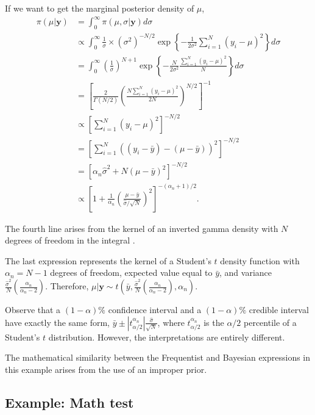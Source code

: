 If we want to get the marginal posterior density of $\mu$, 
\begin{align*}
	\pi(\mu|\mathbf{y})&=\int_{0}^{\infty} \pi(\mu,\sigma|\mathbf{y}) d\sigma\\
	&\propto \int_{0}^{\infty} \frac{1}{\sigma}\times (\sigma^2)^{-N/2}\exp\left\{-\frac{1}{2\sigma^2}\sum_{i=1}^N (y_i-\mu)^2\right\} d\sigma\\ 
	&= \int_{0}^{\infty} \left(\frac{1}{\sigma}\right)^{N+1} \exp\left\{-\frac{N}{2\sigma^2}\frac{\sum_{i=1}^N (y_i-\mu)^2}{N}\right\} d\sigma\\
	&=\left[\frac{2}{\Gamma(N/2)}\left(\frac{N\sum_{i=1}^N (y_i-\mu)^2}{2N}\right)^{N/2}\right]^{-1}\\
	&\propto \left[\sum_{i=1}^N (y_i-\mu)^2\right]^{-N/2}\\
	&=\left[\sum_{i=1}^N ((y_i-\bar{y})-(\mu-\bar{y}))^2\right]^{-N/2}\\
	&=[\alpha_n\hat{\sigma}^2+N(\mu-\bar{y})^2]^{-N/2}\\
	&\propto \left[1+\frac{1}{\alpha_n}\left(\frac{\mu-\bar{y}}{\hat{\sigma}/\sqrt{N}}\right)^2\right]^{-(\alpha_n+1)/2}.
\end{align*}

The fourth line arises from the kernel of an inverted gamma density with $N$ degrees of freedom in the integral \cite{zellner1996introduction}.

The last expression represents the kernel of a Student's $t$ density function with $\alpha_n = N - 1$ degrees of freedom, expected value equal to $\bar{y}$, and variance $\frac{\hat{\sigma}^2}{N} \left( \frac{\alpha_n}{\alpha_n - 2} \right)$. Therefore, $\mu | \mathbf{y} \sim t \left( \bar{y}, \frac{\hat{\sigma}^2}{N} \left( \frac{\alpha_n}{\alpha_n - 2} \right), \alpha_n \right)$.

Observe that a $(1-\alpha)\%$ confidence interval and a $(1-\alpha)\%$ credible interval have exactly the same form, $\bar{y} \pm |t_{\alpha/2}^{\alpha_n}| \frac{\hat{\sigma}}{\sqrt{N}}$, where $t_{\alpha/2}^{\alpha_n}$ is the $\alpha/2$ percentile of a Student's $t$ distribution. However, the interpretations are entirely different.

The mathematical similarity between the Frequentist and Bayesian expressions in this example arises from the use of an improper prior.

\subsection{Example: Math test}\label{sec261}

